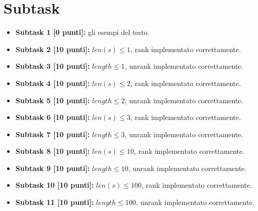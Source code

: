   \section*{Subtask}
  \begin{itemize}
    \item \textbf{Subtask 1 [0 punti]:} gli esempi del testo.
    \item \textbf{Subtask 2 [10 punti]:} $len(s) \le 1$, rank implementato correttamente.
    \item \textbf{Subtask 3 [10 punti]:} $length \le 1$, unrank implementato correttamente.
    \item \textbf{Subtask 4 [10 punti]:} $len(s) \le 2$, rank implementato correttamente.
    \item \textbf{Subtask 5 [10 punti]:} $length \le 2$, unrank implementato correttamente.
    \item \textbf{Subtask 6 [10 punti]:} $len(s) \le 3$, rank implementato correttamente.
    \item \textbf{Subtask 7 [10 punti]:} $length \le 3$, unrank implementato correttamente.
    \item \textbf{Subtask 8 [10 punti]:} $len(s) \le 10$, rank implementato correttamente.
    \item \textbf{Subtask 9 [10 punti]:} $length \le 10$, unrank implementato correttamente.
    \item \textbf{Subtask 10 [10 punti]:} $len(s) \le 100$, rank implementato correttamente.
    \item \textbf{Subtask 11 [10 punti]:} $length \le 100$, unrank implementato correttamente.
  \end{itemize}
  
